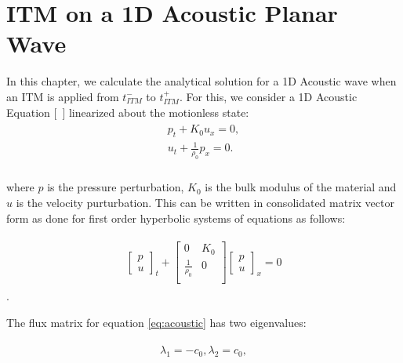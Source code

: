 
\section{\ac{ITM} on a 1D Acoustic Planar Wave}\label{section:ITMAcoustic}
In this chapter, we calculate the analytical solution for a 1D Acoustic wave when an \ac{ITM} is applied from $t_{ITM}^-$ to $t_{ITM}^+$.
For this, we consider a 1D Acoustic Equation [~\parencite[Sec. 2.8]{leveque_2002}] linearized about the motionless state:
\begin{align}
    \begin{split}
        p_t + K_0u_x = 0, \\
        u_t + \frac{1}{\rho_0}p_x = 0 .\\
    \end{split}
\end{align}

where $p$ is the pressure perturbation, $K_0$ is the bulk modulus of the material and $u$ is the velocity purturbation. 
This can be written in consolidated matrix vector form as done for first order hyperbolic systems of equations as follows:

\begin{align}
    \begin{split}
    \begin{bmatrix}
        p \\
        u
    \end{bmatrix}_t + 
    \begin{bmatrix}
        0 & K_0 \\
        \frac{1}{\rho_0} & 0 \\
    \end{bmatrix}
    \begin{bmatrix}
        p \\
        u
    \end{bmatrix}_x = 0
    \end{split}
    \label{eq:acoustic}
\end{align}.

The flux matrix for equation \ref{eq:acoustic} has two eigenvalues:

\begin{align}
    \begin{split}
        \lambda_1 = -c_0, \lambda_2 = c_0,
    \end{split}
\end{align}

